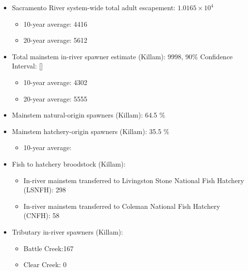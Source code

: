 \documentclass[
]{book}
\providecommand{\tightlist}{%
  \setlength{\itemsep}{0pt}\setlength{\parskip}{0pt}}
\theoremstyle{definition}
\theoremstyle{definition}
\theoremstyle{definition}
\theoremstyle{definition}
\theoremstyle{remark}
\begin{document}
\begin{itemize}
\tightlist
\item
  Sacramento River system-wide total adult escapement: \ensuremath{1.0165\times 10^{4}}

  \begin{itemize}
  \tightlist
  \item
    10-year average: 4416
  \item
    20-year average: 5612
  \end{itemize}
\item
  Total mainstem in-river spawner estimate (Killam): 9998, 90\% Confidence Interval: {[}{]}

  \begin{itemize}
  \tightlist
  \item
    10-year average: 4302
  \item
    20-year average: 5555
  \end{itemize}
\item
  Mainstem natural-origin spawners (Killam): 64.5 \%
\item
  Mainstem hatchery-origin spawners (Killam): 35.5 \%

  \begin{itemize}
  \tightlist
  \item
    10-year average:
  \end{itemize}
\item
  Fish to hatchery broodstock (Killam):

  \begin{itemize}
  \tightlist
  \item
    In-river mainstem transferred to Livingston Stone National Fish Hatchery (LSNFH): 298
  \item
    In-river mainstem transferred to Coleman National Fish Hatchery (CNFH): 58
  \end{itemize}
\item
  Tributary in-river spawners (Killam):

  \begin{itemize}
  \tightlist
  \item
    Battle Creek:167
  \item
    Clear Creek: 0
  \end{itemize}
\end{itemize}
\end{document}
